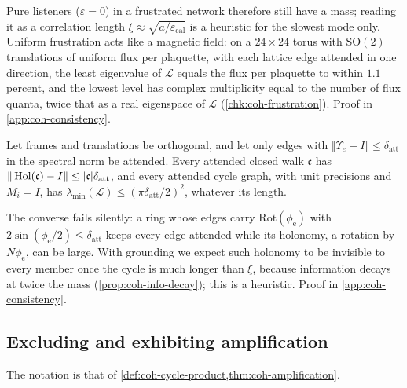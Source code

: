 Pure listeners ($\varepsilon=0$) in a frustrated network therefore still have a mass; reading it as a correlation length $\xi\approx\sqrt{a/\varepsilon_{\mathrm{cal}}}$ is a heuristic for the slowest mode only. Uniform frustration acts like a magnetic field: on a $24\times24$ torus with $\mathrm{SO}(2)$ translations of uniform flux per plaquette, with each lattice edge attended in one direction, the least eigenvalue of $\mathcal L$ equals the flux per plaquette to within $1.1$ percent, and the lowest level has complex multiplicity equal to the number of flux quanta, twice that as a real eigenspace of $\mathcal L$ (\cref{chk:coh-frustration}). Proof in \cref{app:coh-consistency}.

\begin{proposition}\label{prop:coh-attended-frustration}
Let frames and translations be orthogonal, and let only edges with $\Vert\Upsilon_e-I\Vert\le\delta_{\mathrm{att}}$ in the spectral norm be attended. Every attended closed walk $\mathfrak c$ has $\Vert\operatorname{Hol}(\mathfrak c)-I\Vert\le|\mathfrak c|\delta_{\mathrm{att}}$, and every attended cycle graph, with unit precisions and $M_i=I$, has $\lambda_{\min}(\mathcal L)\le(\pi\delta_{\mathrm{att}}/2)^2$, whatever its length.
\end{proposition}

The converse fails silently: a ring whose edges carry $\mathrm{Rot}(\phi_{\mathrm e})$ with $2\sin(\phi_{\mathrm e}/2)\le\delta_{\mathrm{att}}$ keeps every edge attended while its holonomy, a rotation by $N\phi_{\mathrm e}$, can be large. With grounding we expect such holonomy to be invisible to every member once the cycle is much longer than $\xi$, because information decays at twice the mass (\cref{prop:coh-info-decay}); this is a heuristic. Proof in \cref{app:coh-consistency}.

\subsection{Excluding and exhibiting amplification}\label{sup:coh-excluding-and-exhibiting-amplification}

The notation is that of \cref{def:coh-cycle-product,thm:coh-amplification}.

